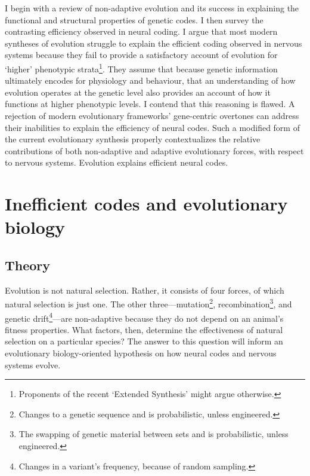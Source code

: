 \documentclass{article}
\begin{document}
I begin with a review of non-adaptive evolution and its success in explaining the functional and structural properties of genetic codes. I then survey the contrasting efficiency observed in neural coding. I argue that most modern syntheses of evolution \cite{huxley2010evolution, kimura1983neutral} struggle to explain the efficient coding observed in nervous systems because they fail to provide a satisfactory account of evolution for `higher' phenotypic strata\footnote{Proponents of the recent `Extended Synthesis' \cite{pigliucci2010evolution} might argue otherwise.}. They assume that because genetic information ultimately encodes for physiology and behaviour, that an understanding of how evolution operates at the genetic level also provides an account of how it functions at higher phenotypic levels. I contend that this reasoning is flawed. A rejection of modern evolutionary frameworks' gene-centric overtones can address their inabilities to explain the efficiency of neural codes. Such a modified form of the current evolutionary synthesis properly contextualizes the relative contributions of both non-adaptive and adaptive evolutionary forces, with respect to nervous systems. Evolution explains efficient neural codes. 

\section{Inefficient codes and evolutionary biology}

\subsection{Theory}

Evolution is not natural selection. Rather, it consists of four forces, of which natural selection is just one. The other three---mutation\footnote{Changes to a genetic sequence and is probabilistic, unless engineered.}, recombination\footnote{The swapping of genetic material between sets and is probabilistic, unless engineered.}, and genetic drift\footnote{Changes in a variant's frequency, because of random sampling.}---are non-adaptive because they do not depend on an animal's fitness properties. What factors, then, determine the effectiveness of natural selection on a particular species? The answer to this question will inform an evolutionary biology-oriented hypothesis on how neural codes and nervous systems evolve.
\end{document}

